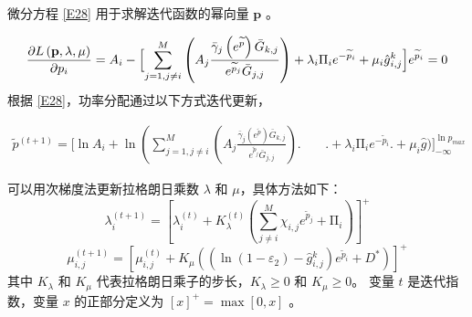 微分方程 \eqref{E28} 用于求解迭代函数的幂向量 $\mathbf{p}$ 。

\begin{align}\label{E28}
\frac{\partial L\left(\mathbf{p},\lambda,\mu\right)}{\partial p_i}=A_i-\Bigl[\sum_{j=1,j\neq i}^{M}\left(A_j\frac{{\bar{\gamma}}_j\left(e^{\widetilde{p}}\right){\bar{G}}_{k,j}}{e^{{\widetilde{p}}_j}{\bar{G}}_{j,j}}\right)
+\lambda_i\mathrm{\Pi}_ie^{-{\widetilde{p}}_i}+\mu_i{\hat{g}}\phantom{}_{i,j}^k\Bigl]e^{{\widetilde{p}}_i}=0
\end{align}
根据 \eqref{E28}，功率分配通过以下方式迭代更新，

\begin{align}\label{E29}
{\widetilde{p}}\phantom{}^{\left(t+1\right)}=\Big[\ln{A_i}+\ln\left(\sum_{j=1,j\neq i}^{M}\left(A_j\frac{{\bar{\gamma}}_j\left(e^{\widetilde{p}}\right){\bar{G}}_{k,j}}{e^{{\widetilde{p}}_j}{\bar{G}}_{j,j}}\right)\Big.\right.\phantom{=\;\;}\Big.\!\!\!\!\!\!\!\!\!\!\!+\lambda_i\mathrm{\Pi}_ie^{-{\widetilde{p}}_i}\Big.+\mu_i\hat{g}\Big)
\Big]_{-\infty}^{\ln{p_{max}}}
\end{align}

可以用次梯度法更新拉格朗日乘数 $\lambda$ 和 $\mu$，具体方法如下：
\begin{equation}\label{E30}
\lambda_i^{\left(t+1\right)}=\left[\lambda_i^{\left(t\right)}+K_\lambda^{\left(t\right)}\left(\sum_{j\neq i}^{M}{\chi_{i,j}e^{{\widetilde{p}}_j}}+\mathrm{\Pi}_i\right)\right]^+
\end{equation}
\begin{equation}\label{E31}
\mu_{i,j}^{\left(t+1\right)}=\!\left[\mu_{i,j}^{\left(t\right)}+\!K_\mu\!\left(\left(\ln\left(1-\varepsilon_2\right)-{\hat{g}}\phantom{}_{i,j}^k\right)e^{{\widetilde{p}}_i}+D^\ast\right)\right]^+
\end{equation}
其中 $K_\lambda$ 和 $K_\mu$ 代表拉格朗日乘子的步长，$K_\lambda\geq0$ 和 $K_\mu\geq0$。 变量 $t$ 是迭代指数，变量 $x$ 的正部分定义为 $\left[x\right]^+=\max{\left[0,x\right]} $ 。
